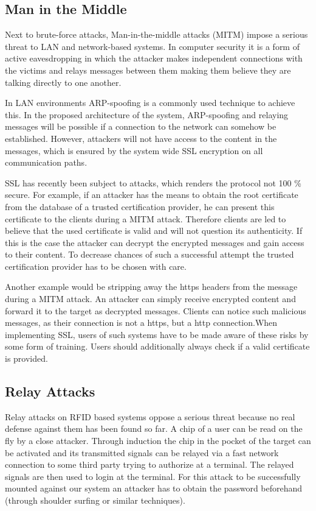 \documentclass[12pt,a4paper,titlepage,oneside]{scrartcl}
\begin{document}
\subsection{Man in the Middle}
Next to brute-force attacks, Man-in-the-middle attacks (MITM) impose a serious threat to LAN and network-based systems. In computer security it is a form of active eavesdropping in which the attacker makes independent connections with the victims and relays messages between them making them believe they are talking directly to one another.

In LAN environments ARP-spoofing is a commonly used technique to achieve this. In the proposed architecture of the system, ARP-spoofing and relaying messages will be possible if a connection to the network can somehow be established. However, attackers will not have access to the content in the messages, which is ensured by the system wide SSL encryption on all communication paths.

SSL has recently been subject to attacks, which renders the protocol not 100 \% secure. For example, if an attacker has the means to obtain the root certificate from the database of a trusted certification provider, he can present this certificate to the clients during a MITM attack. Therefore clients are led to believe that the used certificate is valid and will not question its authenticity. If this is the case the attacker can decrypt the encrypted messages and gain access to their content. To decrease chances of such a successful attempt the trusted certification provider has to be chosen with care.

Another example would be stripping away the https headers from the message during a MITM attack. An attacker can simply receive encrypted content and forward it to the target as decrypted messages. Clients can notice such malicious messages, as their connection is not a https, but a http connection.When implementing SSL, users of such systems have to be made aware of these risks by some form of training. Users should additionally always check if a valid certificate is provided.

\subsection{Relay Attacks}
Relay attacks on RFID based systems oppose a serious threat because no real defense against them has been found so far. A chip of a user can be read on the fly by a close attacker. Through induction the chip in the pocket of the target can be activated and its transmitted signals can be relayed via a fast network connection to some third party trying to authorize at a terminal. The relayed signals are then used to login at the terminal. For this attack to be successfully mounted against our system an attacker has to obtain the password beforehand (through shoulder surfing or similar techniques).
\end{document}
